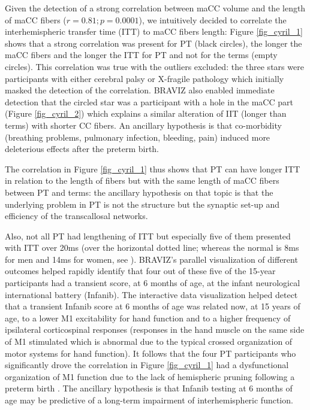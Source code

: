 \documentclass{frontiersHLTH}
\begin{document}

Given the detection of a strong correlation between maCC volume and the length of maCC fibers ($r=0.81; p=0.0001$), we intuitively decided to correlate the interhemispheric transfer time (ITT) to maCC fibers length: Figure \ref{fig_cyril_1} shows that a strong correlation was present for PT (black circles), the longer the maCC fibers and the longer the ITT for PT and not for the terms (empty circles). This correlation was true with the outliers excluded: the three stars were participants with either cerebral palsy or X-fragile pathology which initially masked the detection of the correlation. BRAVIZ also enabled  immediate detection that the circled star was a participant with a hole in the maCC part (Figure \ref{fig_cyril_2}) which explains a similar alteration of IIT (longer than terms) with shorter CC fibers. An ancillary hypothesis is that co-morbidity (breathing problems, pulmonary infection, bleeding, pain) induced more deleterious effects after the preterm birth.


The correlation in Figure \ref{fig_cyril_1} thus shows that PT can have longer ITT in relation to the length of fibers but with the same length of maCC fibers between PT and terms: the ancillary hypothesis on that topic is that the underlying problem in PT is not the structure but the synaptic set-up and efficiency of the transcallosal networks.

Also, not all PT had lengthening of ITT but especially five of them presented with ITT over 20ms (over the horizontal dotted line; whereas the normal is 8ms for men and 14ms for women, see \cite{schneider_cerebral_2012}). BRAVIZ’s parallel visualization of different outcomes helped rapidly identify that four out of these five of the 15-year participants had a transient score, at 6 months of age, at the infant neurological international battery (Infanib). 
The interactive data visualization helped detect that a transient Infanib score at 6 months of age was related now, at 15 years of age, to a lower M1 excitability for hand function and to a higher frequency of ipsilateral corticospinal responses (responses in the hand muscle on the same side of M1 stimulated which is abnormal due to the typical crossed organization of motor systems for hand function). It follows that the four PT participants who significantly drove the correlation in Figure \ref{fig_cyril_1} had a dysfunctional organization of M1 function due to the lack of hemispheric pruning following a preterm birth \cite{schneider_cerebral_2012}. The ancillary hypothesis is that Infanib testing at 6 months of age may be predictive of a long-term impairment of interhemispheric function.
\end{document}
